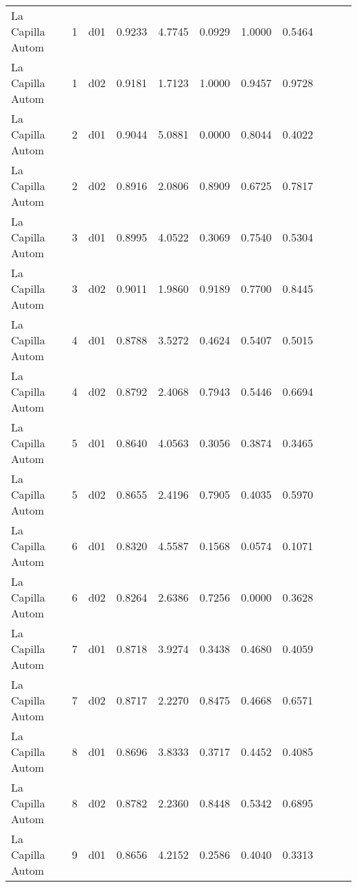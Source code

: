 \begin{landscape}
\begin{longtable}{p{2cm}rrrrrrrrrr}
        La Capilla Autom  &          1 &     d01 &   0.9233 &  4.7745 &        0.0929 &           1.0000 &  0.5464 \\
        La Capilla Autom  &          1 &     d02 &   0.9181 &  1.7123 &        1.0000 &           0.9457 &  0.9728 \\
        La Capilla Autom  &          2 &     d01 &   0.9044 &  5.0881 &        0.0000 &           0.8044 &  0.4022 \\
        La Capilla Autom  &          2 &     d02 &   0.8916 &  2.0806 &        0.8909 &           0.6725 &  0.7817 \\
        La Capilla Autom  &          3 &     d01 &   0.8995 &  4.0522 &        0.3069 &           0.7540 &  0.5304 \\
        La Capilla Autom  &          3 &     d02 &   0.9011 &  1.9860 &        0.9189 &           0.7700 &  0.8445 \\
        La Capilla Autom  &          4 &     d01 &   0.8788 &  3.5272 &        0.4624 &           0.5407 &  0.5015 \\
        La Capilla Autom  &          4 &     d02 &   0.8792 &  2.4068 &        0.7943 &           0.5446 &  0.6694 \\
        La Capilla Autom  &          5 &     d01 &   0.8640 &  4.0563 &        0.3056 &           0.3874 &  0.3465 \\
        La Capilla Autom  &          5 &     d02 &   0.8655 &  2.4196 &        0.7905 &           0.4035 &  0.5970 \\
        La Capilla Autom  &          6 &     d01 &   0.8320 &  4.5587 &        0.1568 &           0.0574 &  0.1071 \\
        La Capilla Autom  &          6 &     d02 &   0.8264 &  2.6386 &        0.7256 &           0.0000 &  0.3628 \\
        La Capilla Autom  &          7 &     d01 &   0.8718 &  3.9274 &        0.3438 &           0.4680 &  0.4059 \\
        La Capilla Autom  &          7 &     d02 &   0.8717 &  2.2270 &        0.8475 &           0.4668 &  0.6571 \\
        La Capilla Autom  &          8 &     d01 &   0.8696 &  3.8333 &        0.3717 &           0.4452 &  0.4085 \\
        La Capilla Autom  &          8 &     d02 &   0.8782 &  2.2360 &        0.8448 &           0.5342 &  0.6895 \\
        La Capilla Autom  &          9 &     d01 &   0.8656 &  4.2152 &        0.2586 &           0.4040 &  0.3313 \\

\end{longtable}
\end{landscape}
